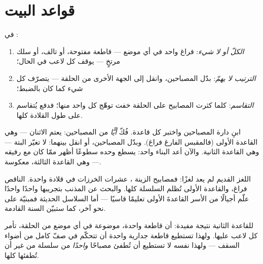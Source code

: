 \section{قواعد البيت}

\begin{proposition}\label{prop:g4:series-circuits:rules}
في :
\begin{enumerate}
  \item \emph{الكلّ أو لا شيء}: فراغ واحد في أي موضع --- قاطعة
        مفتوحة، أو  تالف، أو سلك مرتخٍ --- يوقف كل لاعب في
        الحال؛
  \item \emph{الترتيب لا يهمّ}: بدّل المصباحين، وانقل 
        إلى الجهة الأخرى من الحلقة --- يتصرّف كل شيء كما كان
        بالضبط؛
  \item \emph{التقاسم}: كلما كثرت المصابيح على الحلقة خفت توهّج
        كل واحد منها؛ فدفع  يُتقاسم على طول القلادة
        كلها.
\end{enumerate}
\end{proposition}

\begin{example}\label{ex:g4:series-circuits:seeing}
ابنِ دارة المصباحين واختبر كل قاعدة. فُكّ \emph{أيًّا} من
المصباحين: يعتم الاثنان --- وهي القاعدة الأولى (فالمقبس الفارغ
فراغ). وبدّل المصباحين، أو انقل  بينهما: لا تغيّر البتة
--- وهي القاعدة الثانية. والآن أعد البناء  واحد: يسطع
وحده سطوعًا أظهر ممّا كان مع رفيقه --- وهي القاعدة الثالثة،
معكوسة.
\end{example}

\begin{example}\label{ex:g4:series-circuits:partylights}
اللغز القديم لم يعد لغزًا: فمصابيح الزينة ، عشرات
الخرزات في قلادة واحدة.  الناقص فراغ، والقاعدة الأولى
تُظلم السلسلة كلها. والبحث عن  المذنب بتجريبها واحدًا
واحدًا علّم أجيالًا من الأسر القاعدةَ الأولى تعليمًا قاسيًا ---
أما السلاسل الحديثة فمبنيّة على نحو آخر، كما ستبيّن السنة
القادمة.
\end{example}

\begin{remark}\label{rem:g4:series-circuits:switch}
للقاعدة الثانية نتيجة مفيدة: أن قاطعة واحدة، موضوعة في أي موضع
من الحلقة، تأمر كل لاعب عليها. ولهذا تستطيع قاطعة جدارية واحدة
أن تتحكّم في صفّ كامل من أضواء السقف --- ولهذا نفسه لا تستطيع
أن تُطفئ مصباحًا \emph{واحدًا} من سلسلة  من غير أن
تُطفئها كلها.
\end{remark}


